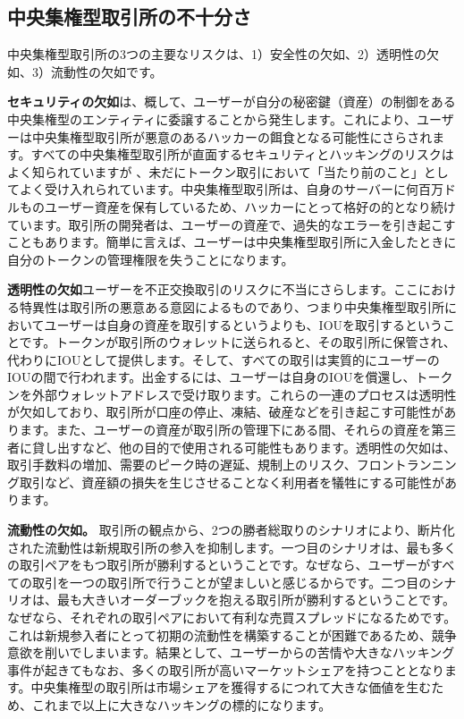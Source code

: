 \documentclass{article}
\begin{document}
\begin{multicols}{2}
\subsection{中央集権型取引所の不十分さ}
中央集権型取引所の3つの主要なリスクは、1）安全性の欠如、2）透明性の欠如、3）流動性の欠如です。

\textbf{セキュリティの欠如}は、概して、ユーザーが自分の秘密鍵（資産）の制御をある中央集権型のエンティティに委譲することから発生します。これにより、ユーザーは中央集権型取引所が悪意のあるハッカーの餌食となる可能性にさらされます。すべての中央集権型取引所が直面するセキュリティとハッキングのリスクはよく知られていますが\cite{coincheckhack}  \cite{mcmillan2014inside}、未だにトークン取引において「当たり前のこと」としてよく受け入れられています。中央集権型取引所は、自身のサーバーに何百万ドルものユーザー資産を保有しているため、ハッカーにとって格好の的となり続けています。取引所の開発者は、ユーザーの資産で、過失的なエラーを引き起こすこともあります。簡単に言えば、ユーザーは中央集権型取引所に入金したときに自分のトークンの管理権限を失うことになります。  

\textbf{透明性の欠如}ユーザーを不正交換取引のリスクに不当にさらします。ここにおける特異性は取引所の悪意ある意図によるものであり、つまり中央集権型取引所においてユーザーは自身の資産を取引するというよりも、IOUを取引するということです。トークンが取引所のウォレットに送られると、その取引所に保管され、代わりにIOUとして提供します。そして、すべての取引は実質的にユーザーのIOUの間で行われます。出金するには、ユーザーは自身のIOUを償還し、トークンを外部ウォレットアドレスで受け取ります。これらの一連のプロセスは透明性が欠如しており、取引所が口座の停止、凍結、破産などを引き起こす可能性があります。また、ユーザーの資産が取引所の管理下にある間、それらの資産を第三者に貸し出すなど、他の目的で使用される可能性もあります。透明性の欠如は、取引手数料の増加、需要のピーク時の遅延、規制上のリスク、フロントランニング取引など、資産額の損失を生じさせることなく利用者を犠牲にする可能性があります。

\textbf{流動性の欠如。} 取引所の観点から、2つの勝者総取りのシナリオにより、断片化された流動性は新規取引所の参入を抑制します。一つ目のシナリオは、最も多くの取引ペアをもつ取引所が勝利するということです。なぜなら、ユーザーがすべての取引を一つの取引所で行うことが望ましいと感じるからです。二つ目のシナリオは、最も大きいオーダーブックを抱える取引所が勝利するということです。なぜなら、それぞれの取引ペアにおいて有利な売買スプレッドになるためです。これは新規参入者にとって初期の流動性を構築することが困難であるため、競争意欲を削いでしまいます。結果として、ユーザーからの苦情や大きなハッキング事件が起きてもなお、多くの取引所が高いマーケットシェアを持つこととなります。中央集権型の取引所は市場シェアを獲得するにつれて大きな価値を生むため、これまで以上に大きなハッキングの標的になります。


\end{multicols}
\end{document}
